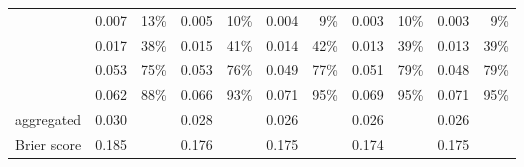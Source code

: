 {\begin{table}[htbp]
\begin{tabular}{lrrrrrrrrrr}
\OrChecker{} & 0.007 & 13\% & 0.005 & 10\% & 0.004 & 9\% & 0.003 & 10\% & 0.003 & 9\% \\
\AndOrChecker{} & 0.017 & 38\% & 0.015 & 41\% & 0.014 & 42\% & 0.013 & 39\% & 0.013 & 39\% \\
\ButChecker{} & 0.053 & 75\% & 0.053 & 76\% & 0.049 & 77\% & 0.051 & 79\% & 0.048 & 79\% \\
\CondChecker{} & 0.062 & 88\% & 0.066 & 93\% & 0.071 & 95\% & 0.069 & 95\% & 0.071 & 95\% \\
aggregated & 0.030 &  & 0.028 &  & 0.026 &  & 0.026 &  & 0.026 &  \\
Brier score & 0.185 &  & 0.176 &  & 0.175 &  & 0.174 &  & 0.175 &  \\
\bottomrule
\end{tabular}
\label{tab:cf-px}
\end{table}

}
